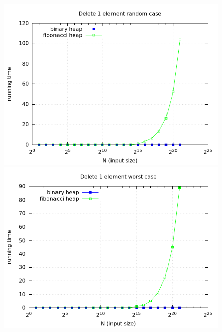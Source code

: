 \documentclass[a4paper,oneside,article,11pt]{memoir}
\begin{document}
\begin{figure}[H]
\centering
\begin{minipage}{0.48\columnwidth}
  \centering
  \includegraphics[width=\linewidth]{../res/delmin/delmin_del_1_time_random.png}%
  \caption{}
  \label{fig:delmin_1_random_time}
\end{minipage}%
\hfill
\begin{minipage}{0.48\columnwidth}
  \centering
  \includegraphics[width=\linewidth]{../res/delmin/delmin_del_1_time_worst.png}%
  \caption{}
  \label{fig:delmin_1_worst_time}
\end{minipage}
\end{figure}
\end{document}
